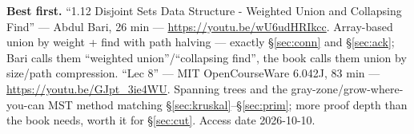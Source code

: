 \begin{rulebox}
\smallskip\noindent\textbf{Best first.}
``1.12 Disjoint Sets Data Structure - Weighted Union and Collapsing
Find'' --- Abdul Bari, 26 min ---
\url{https://youtu.be/wU6udHRIkcc}. Array-based union
by weight + find with path halving --- exactly \S\ref{sec:conn} and
\S\ref{sec:ack}; Bari calls them ``weighted union''/``collapsing
find'', the book calls them union by size/path compression.
\smallskip\noindent
``Lec 8'' --- MIT OpenCourseWare 6.042J, 83 min ---
\url{https://youtu.be/GJpt_3ie4WU}. Spanning trees and
the gray-zone/grow-where-you-can MST method matching
\S\ref{sec:kruskal}--\S\ref{sec:prim}; more proof depth than the book
needs, worth it for \S\ref{sec:cut}. Access date 2026-10-10.
\end{rulebox}
